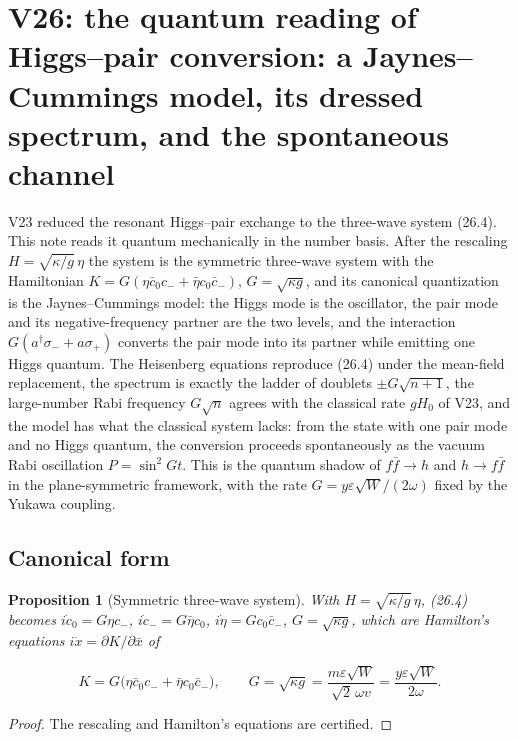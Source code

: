 \documentclass[11pt]{article}
\newtheorem{proposition}[theorem]{Proposition}
\theoremstyle{remark}
\begin{document}
\section{V26: the quantum reading of Higgs--pair conversion: a Jaynes--Cummings model, its dressed spectrum, and the spontaneous channel}
\label{sec:v20v26}

V23 reduced the resonant Higgs--pair exchange to the three-wave
system (26.4).  This note reads it quantum mechanically in the number
basis.  After the rescaling \(H=\sqrt{\kappa/g}\,\eta\) the system is
the symmetric three-wave system with the Hamiltonian
\(K=G(\eta\bar c_0c_-+\bar\eta c_0\bar c_-)\), \(G=\sqrt{\kappa g}\),
and its canonical quantization is the Jaynes--Cummings model: the
Higgs mode is the oscillator, the pair mode and its
negative-frequency partner are the two levels, and the interaction
\(G(a^\dagger\sigma_-+a\sigma_+)\) converts the pair mode into its
partner while emitting one Higgs quantum.  The Heisenberg equations
reproduce (26.4) under the mean-field replacement, the spectrum is
exactly the ladder of doublets \(\pm G\sqrt{n+1}\), the large-number
Rabi frequency \(G\sqrt n\) agrees with the classical rate \(gH_0\) of
V23, and the model has what the classical system lacks: from the
state with one pair mode and no Higgs quantum, the conversion
proceeds spontaneously as the vacuum Rabi oscillation
\(P=\sin^2Gt\).  This is the quantum shadow of \(f\bar f\to h\) and
\(h\to f\bar f\) in the plane-symmetric framework, with the rate
\(G=y\varepsilon\sqrt W/(2\omega)\) fixed by the Yukawa coupling.

\subsection{Canonical form}

\begin{proposition}[Symmetric three-wave system]
\label{prop:v20v26-canonical}
With \(H=\sqrt{\kappa/g}\,\eta\), (26.4) becomes
\(i\dot c_0=G\eta c_-\), \(i\dot c_-=G\bar\eta c_0\),
\(i\dot\eta=Gc_0\bar c_-\), \(G=\sqrt{\kappa g}\), which are Hamilton's
equations \(i\dot x=\partial K/\partial\bar x\) of

\[
 K=G\bigl(\eta\bar c_0c_-+\bar\eta c_0\bar c_-\bigr),\qquad
 G=\sqrt{\kappa g}=\frac{m\varepsilon\sqrt W}{\sqrt2\,\omega v}=\frac{y\varepsilon\sqrt W}{2\omega}.
                                                                    \tag{29.1}
\]
\end{proposition}

\begin{proof}
The rescaling and Hamilton's equations are certified.
\end{proof}
\end{document}
